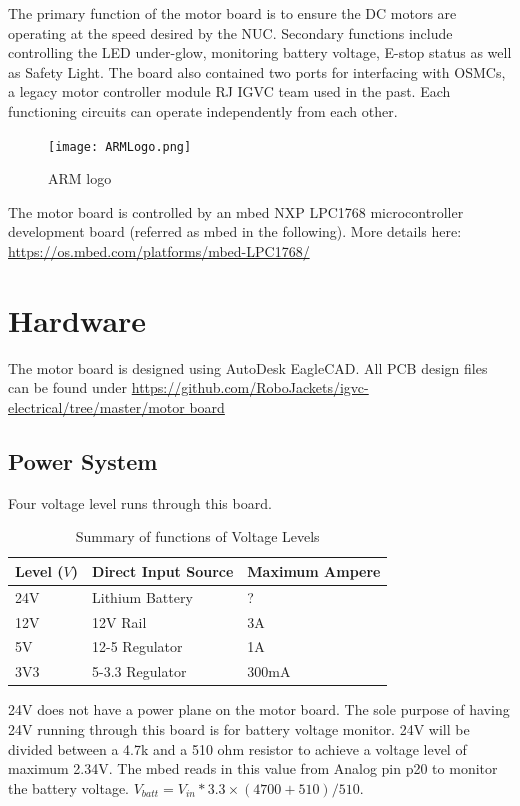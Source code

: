 \documentclass[letterpaper, 12pt]{article}
\begin{document}
The primary function of the motor board is to ensure the DC motors are operating at the speed desired by the NUC. Secondary functions include controlling the LED under-glow, monitoring battery voltage, E-stop status as well as Safety Light. The board also contained two ports for interfacing with OSMCs, a legacy motor controller module RJ IGVC team used in the past. Each functioning circuits can operate independently from each other. \vspace{6pt}\\

\begin{figure}[h]
\centering
\texttt{[image: ARMLogo.png]}
\caption{ARM logo}
\end{figure}

The motor board is controlled by an mbed NXP LPC1768 microcontroller development board (referred as mbed in the following). More details here: \url{https://os.mbed.com/platforms/mbed-LPC1768/} \vspace{6pt}\\
\pagebreak

\section{Hardware}
The motor board is designed using AutoDesk EagleCAD. All PCB design files can be found under \url{https://github.com/RoboJackets/igvc-electrical/tree/master/motor board}
\subsection{Power System}
Four voltage level runs through this board. 
\begin{table}[h]
\caption{Summary of functions of Voltage Levels}
\centering
\begin{tabular}{p{3cm}p{4cm}p{4cm}}
\toprule
Level ($V$)  & Direct Input Source & Maximum Ampere \\
\midrule
24V  & Lithium Battery & ? \\
12V  & 12V Rail & 3A  \\
5V  & 12-5 Regulator & 1A \\
3V3 & 5-3.3 Regulator & 300mA \\
\bottomrule
\end{tabular}
\end{table}

24V does not have a power plane on the motor board. The sole purpose of having 24V running through this board is for battery voltage monitor. 24V will be divided between a 4.7k and a 510 ohm resistor to achieve a voltage level of maximum 2.34V. The mbed reads in this value from Analog pin p20 to monitor the battery voltage. $V_{batt} = V_{in} * 3.3 \times (4700 + 510) / 510$. \\
\end{document}

